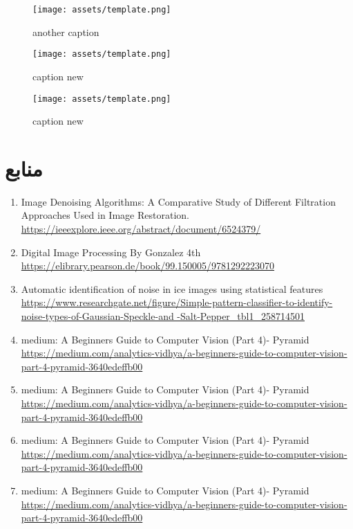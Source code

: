 \documentclass[a4paper,12pt]{article}
\begin{document}
\begin{figure}[ht]
	\centering
	\begin{minipage}[t]{0.32\textwidth}
		\centering
		\texttt{[image: assets/template.png]}
		\caption{\textcolor{CustomAccent}{another caption}}
	\end{minipage}
	\hfill
	\begin{minipage}[t]{0.32\textwidth}
		\centering
		\texttt{[image: assets/template.png]}
		\caption{\textcolor{CustomAccent}{caption new}}
	\end{minipage}
	\vspace{1em}
	\hfill
	\begin{minipage}[t]{0.32\textwidth}
		\centering
		\texttt{[image: assets/template.png]}
		\caption{\textcolor{CustomAccent}{caption new}}
	\end{minipage}
	\vspace{1em}
\end{figure}

	
	
\clearpage
\section*{منابع}
\begin{LTR}
	\begin{latin}
		\begin{enumerate}[left=0pt,labelsep=5pt,itemsep=0pt,parsep=0pt,topsep=0pt]
			\item Image Denoising Algorithms: A Comparative Study of Different Filtration Approaches Used in Image Restoration.  \url{https://ieeexplore.ieee.org/abstract/document/6524379/}
			\item Digital Image Processing By Gonzalez 4th  \url{https://elibrary.pearson.de/book/99.150005/9781292223070}
			\item Automatic identification of noise in ice images using statistical features \url{https://www.researchgate.net/figure/Simple-pattern-classifier-to-identify-noise-types-of-Gaussian-Speckle-and -Salt-Pepper_tbl1_258714501}
			\item medium: A Beginners Guide to Computer Vision (Part 4)- Pyramid \url{https://medium.com/analytics-vidhya/a-beginners-guide-to-computer-vision-part-4-pyramid-3640edeffb00}
			
			
			\item medium: A Beginners Guide to Computer Vision (Part 4)- Pyramid \url{https://medium.com/analytics-vidhya/a-beginners-guide-to-computer-vision-part-4-pyramid-3640edeffb00}
			
			\item medium: A Beginners Guide to Computer Vision (Part 4)- Pyramid \url{https://medium.com/analytics-vidhya/a-beginners-guide-to-computer-vision-part-4-pyramid-3640edeffb00}
			
			\item medium: A Beginners Guide to Computer Vision (Part 4)- Pyramid \url{https://medium.com/analytics-vidhya/a-beginners-guide-to-computer-vision-part-4-pyramid-3640edeffb00}
			
		\end{enumerate}
	\end{latin}
\end{LTR}
\end{document}
